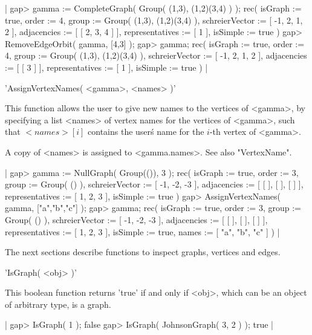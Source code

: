 |    gap> gamma := CompleteGraph( Group( (1,3), (1,2)(3,4) ) );
    rec(
      isGraph := true,
      order := 4,
      group := Group( (1,3), (1,2)(3,4) ),
      schreierVector := [ -1, 2, 1, 2 ],
      adjacencies := [ [ 2, 3, 4 ] ],
      representatives := [ 1 ],
      isSimple := true )
    gap> RemoveEdgeOrbit( gamma, [4,3] );
    gap> gamma;
    rec(
      isGraph := true,
      order := 4,
      group := Group( (1,3), (1,2)(3,4) ),
      schreierVector := [ -1, 2, 1, 2 ],
      adjacencies := [ [ 3 ] ],
      representatives := [ 1 ],
      isSimple := true ) |


'AssignVertexNames( <gamma>, <names> )'

This function  allows  the  user to  give  new names  to the  vertices of
<gamma>, by specifying a list <names> of vertex names for the vertices of
<gamma>, such that $<names>[i]$ contains the user\'s name for  the $i$-th
vertex of <gamma>.

A copy of <names> is assigned to <gamma.names>. See also "VertexName".

|    gap> gamma := NullGraph( Group(()), 3 );
    rec(
      isGraph := true,
      order := 3,
      group := Group( () ),
      schreierVector := [ -1, -2, -3 ],
      adjacencies := [ [  ], [  ], [  ] ],
      representatives := [ 1, 2, 3 ],
      isSimple := true )
    gap> AssignVertexNames( gamma, ["a","b","c"] );
    gap> gamma;
    rec(
      isGraph := true,
      order := 3,
      group := Group( () ),
      schreierVector := [ -1, -2, -3 ],
      adjacencies := [ [  ], [  ], [  ] ],
      representatives := [ 1, 2, 3 ],
      isSimple := true,
      names := [ "a", "b", "c" ] ) |


The next sections describe  functions to  inspect  graphs,  vertices  and
edges.


'IsGraph( <obj> )'

This boolean function  returns 'true' if  and only if <obj>, which can be
an object of arbitrary type, is a graph.

|    gap> IsGraph( 1 );
    false
    gap> IsGraph( JohnsonGraph( 3, 2 ) );
    true |

